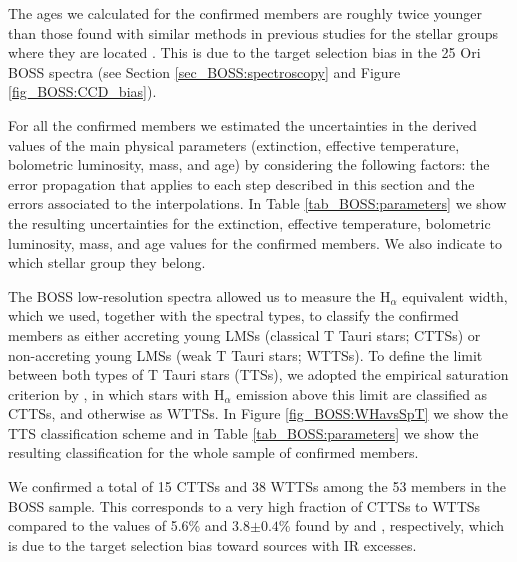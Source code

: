 \documentclass[12pt]{article}
\newcounter{subsubsubsection}[subsubsection]
\begin{document}
The ages we calculated for the confirmed members are roughly twice younger than those found with similar methods in previous studies for the stellar groups where they are located \citep{Kharchenko2005,Briceno2005,Briceno2007,Kharchenko2013,Downes2014}. This is due to the target selection bias in the 25 Ori BOSS spectra (see Section \ref{sec_BOSS:spectroscopy} and Figure \ref{fig_BOSS:CCD_bias}).

For all the confirmed members we estimated the uncertainties in the derived values of the main physical parameters (extinction, effective temperature, bolometric luminosity, mass, and age) by considering the following factors: the error propagation that applies to each step described in this section and the errors associated to the interpolations. In Table \ref{tab_BOSS:parameters} we show the resulting uncertainties for the extinction, effective temperature, bolometric luminosity, mass, and age values for the confirmed members. We also indicate to which stellar group they belong.

\label{sec_BOSS:TTSclass}

The BOSS low-resolution spectra allowed us to measure the H$_\alpha$ equivalent width, which we used, together with the spectral types, to classify the confirmed members as either accreting young LMSs (classical T Tauri stars; CTTSs) or non-accreting young LMSs (weak T Tauri stars; WTTSs). To define the limit between both types of T Tauri stars (TTSs), we adopted the empirical saturation criterion by \citet{BarradoYNavascues-Martin2003}, in which stars with H$_\alpha$ emission above this limit are classified as CTTSs, and otherwise as WTTSs. In Figure \ref{fig_BOSS:WHavsSpT} we show the TTS classification scheme and in Table \ref{tab_BOSS:parameters} we show the resulting classification for the whole sample of confirmed members.

We confirmed a total of 15 CTTSs and 38 WTTSs among the 53 members in the BOSS sample. This corresponds to a very high fraction of CTTSs to WTTSs compared to the values of 5.6\% and 3.8$\pm0.4$\% found by \citet{Briceno2007} and \citet{Downes2014}, respectively, which is due to the target selection bias toward sources with IR excesses.
\end{document}
